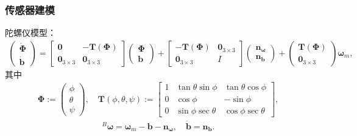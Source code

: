 \documentclass{beamer}
\newcommand{\omegab}{{\vo{\omega}}}
\newcommand{\vo}[1]{\boldsymbol{#1}}
\begin{document}
	\begin{frame}
		\frametitle{传感器建模}
		
		陀螺仪模型：
		\begin{multline}\label{Gyro_M}
			\begin{pmatrix} \dot{\vo{\Phi}} \\ \dot{\vo{b}} \end{pmatrix}
			= \begin{bmatrix} \vo{0} & -\vo{T}(\vo{\Phi})\\ \vo{0}_{3\times3} & \vo{0}_{3\times3}\end{bmatrix}\begin{pmatrix}\vo{\Phi}\\\vo{b}\end{pmatrix} + 
			\begin{bmatrix}-\vo{T}(\vo{\Phi}) & \vo{0}_{3\times3} \\ \vo{0}_{3\times3} & I\end{bmatrix}\begin{pmatrix}\vo{n}_\omegab\\\vo{n_b}\end{pmatrix} + 
			\begin{pmatrix}\vo{T}(\vo{\Phi})\\\vo{0}_{3\times3}\end{pmatrix}\omegab_m,
		\end{multline}
		其中 
		\begin{align} \vo{\Phi}:= \begin{pmatrix} \phi \\ \theta \\ \psi \end{pmatrix}, \quad \nonumber
			\vo{T}(\phi,\theta,\psi) :=
			\begin{bmatrix}
				1 & \tan\theta \sin\phi & \tan\theta \cos\phi \\
				0 & \cos\phi            & -\sin\phi \\
				0 & \sin\phi \sec\theta & \cos\phi \sec\theta
			\end{bmatrix}, \nonumber
		\end{align}
	\begin{align}
	 ^B \omegab = \omegab_m - \vo{b} - \vo{n}_\omegab, \quad
		 \dot{\vo{b}} = \vo{n_b}. \nonumber
	\end{align}\label{gyro_m}
	\end{frame}
\end{document}
